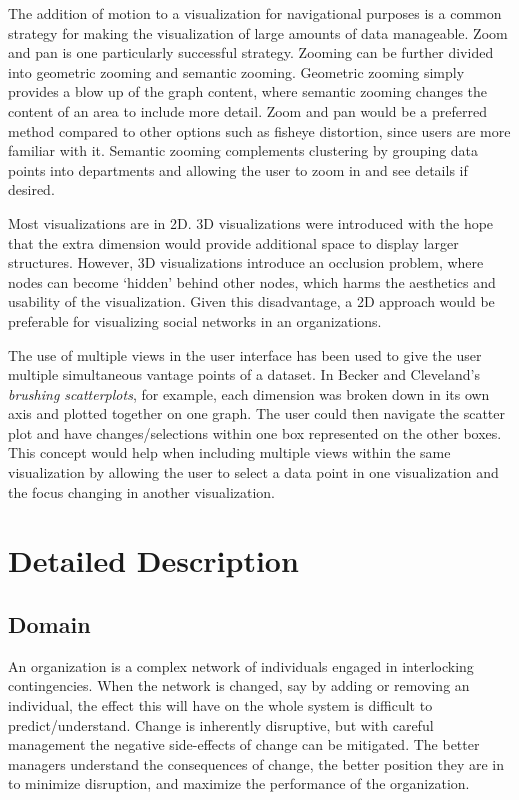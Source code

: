 \documentclass[12pt,letterpaper]{article}
\begin{document}
The addition of motion to a visualization for navigational purposes is a common strategy for making the visualization of large amounts of data manageable. Zoom and pan is one particularly successful strategy. Zooming can be further divided into geometric zooming and semantic zooming.  Geometric zooming simply provides a blow up of the graph content, where semantic zooming changes the content of an area to include more detail\cite{herman2000graph}. Zoom and pan would be a preferred method compared to other options such as fisheye distortion, since users are more familiar with it. Semantic zooming complements clustering by grouping data points into departments and allowing the user to zoom in and see details if desired.

Most visualizations are in 2D. 3D visualizations were introduced with the hope that the extra dimension would provide additional space to display larger structures\cite{herman2000graph}. However, 3D visualizations introduce an occlusion problem, where nodes can become \lq hidden\rq{} behind other nodes, which harms the aesthetics and usability of the visualization\cite{herman2000graph}. Given this disadvantage, a 2D approach would be preferable for visualizing social networks in an organizations.

The use of multiple views in the user interface has been used to give the user multiple simultaneous vantage points of a dataset. In Becker and Cleveland's \emph{brushing scatterplots}\cite{becker1987brushing}, for example, each dimension was broken down in its own axis and plotted together on one graph.  The user could then navigate the scatter plot and have changes/selections within one box represented on the other boxes.  This concept would help when including multiple views within the same visualization by allowing the user to select a data point in one visualization and the focus changing in another visualization.

\section{Detailed Description}

\subsection{Domain}

An organization is a complex network of individuals engaged in interlocking contingencies\cite{glenn2006complexity}. When the network is changed, say by adding or removing an individual, the effect this will have on the whole system is difficult to predict/understand. Change is inherently disruptive, but with careful management the negative side-effects of change can be mitigated. The better managers understand the consequences of change, the better position they are in to minimize disruption, and maximize the performance of the organization. 
\end{document}

